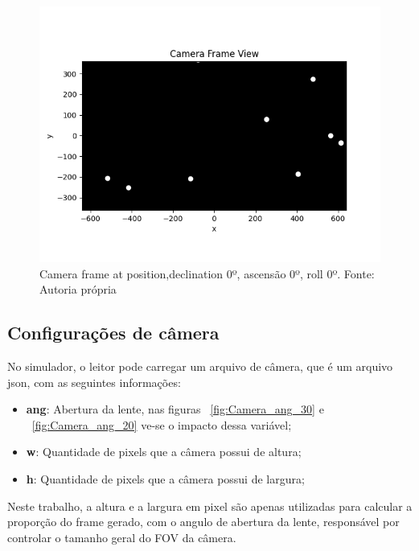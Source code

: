 \begin{figure}[H]
    \centering
    \includegraphics[width=\textwidth]{images/resultado_simulacao.png}
    \caption{Camera frame at position,declination 0º, ascensão 0º, roll 0º. Fonte: Autoria própria}
    \label{fig:resultado_simulacao}
\end{figure}

\subsection{Configurações de câmera}

No simulador, o leitor pode carregar um arquivo de câmera, que é um arquivo json, com as seguintes informações:

\begin{itemize}
    \item \textbf{ang}: Abertura da lente, nas figuras ~\ref{fig:Camera_ang_30} e ~\ref{fig:Camera_ang_20} ve-se o impacto dessa variável;\tabularnewline
    \item \textbf{w}: Quantidade de pixels que a câmera possui de altura;\tabularnewline
    \item \textbf{h}: Quantidade de pixels que a câmera possui de largura;\tabularnewline
\end{itemize}

Neste trabalho, a altura e a largura em pixel são apenas utilizadas para calcular a proporção do frame gerado, com o angulo de abertura da lente, responsável por controlar o tamanho geral do FOV da câmera.

